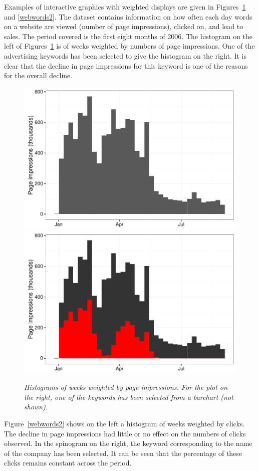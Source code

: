 \documentclass{svmult}
\begin{document}
Examples of interactive graphics with weighted displays are given in Figures~\ref{webwords1} and \ref{webwords2}.  The dataset contains information on how often each day words on a website are viewed (number of page impressions), clicked on, and lead to sales.  The period covered is the first eight months of 2006.  The histogram on the left of Figures~\ref{webwords1} is of weeks weighted by numbers of page impressions.  One of the advertising keywords has been selected to give the histogram on the right.  It is clear that the decline in page impressions for this keyword is one of the reasons for the overall decline.

\begin{figure}[htbp]
  \centering
  \includegraphics[width=0.5\linewidth]{web-words}%
  \includegraphics[width=0.5\linewidth]{web-words-brushed}
  \caption{\em Histograms of weeks weighted by page impressions.  For the plot on the right, one of the keywords has been selected from a barchart (not shown).}
  \label{webwords1}
\end{figure}

Figure~\ref{webwords2} shows on the left a histogram of weeks weighted by clicks.  The decline in page impressions had little or no effect on the numbers of clicks observed.  In the spinogram on the right, the keyword corresponding to the name of the company has been selected.  It can be seen that the percentage of these clicks remains constant across the period.
\end{document}
